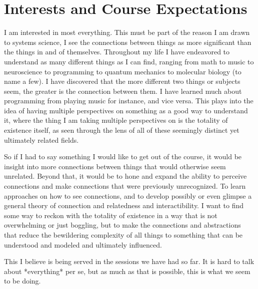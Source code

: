 \documentclass[11pt]{article}
\begin{document}
\maketitle

\section{Interests and Course Expectations}

I am interested in most everything.  This must be part of the reason I am drawn to systems science, I see the connections between things as more significant than the things in and of themselves.  Throughout my life I have endeavored to understand as many different things as I can find, ranging from math to music to neuroscience to programming to quantum mechanics to molecular biology (to name a few).  I have discovered that the more different two things or subjects seem, the greater is the connection between them.  I have learned much about programming from playing music for instance, and vice versa.  This plays into the idea of having multiple perspectives on something as a good way to understand it, where the thing I am taking multiple perspectives on is the totality of existence itself, as seen through the lens of all of these seemingly distinct yet ultimately related fields.  

So if I had to say something I would like to get out of the course, it would be insight into more connections between things that would otherwise seem unrelated.  Beyond that, it would be to hone and expand the ability to perceive connections and make connections that were previously unrecognized.  To learn approaches on how to see connections, and to develop possibly or even glimpse a general theory of connection and relatedness and interactibility.  I want to find some way to reckon with the totality of existence in a way that is not overwhelming or just boggling, but to make the connections and abstractions that reduce the bewildering complexity of all things to something that can be understood and modeled and ultimately influenced.  

This I believe is being served in the sessions we have had so far.  It is hard to talk about *everything* per se, but as much as that is possible, this is what we seem to be doing.
\end{document}
